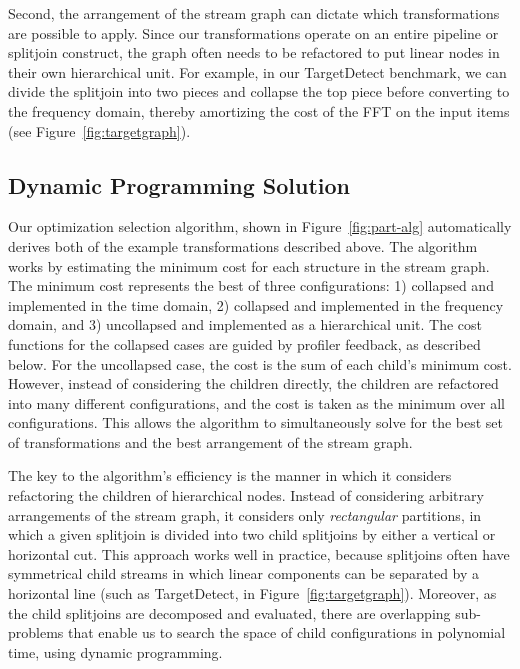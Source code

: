 Second, the arrangement of the stream graph can dictate which
transformations are possible to apply.  Since our transformations
operate on an entire pipeline or splitjoin construct, the
graph often needs to be refactored to put linear nodes in their own
hierarchical unit.  For example, in our TargetDetect benchmark, we can
divide the splitjoin into two pieces and collapse the top piece
before converting to the frequency domain, thereby amortizing the cost
of the FFT on the input items (see Figure~\ref{fig:targetgraph}).

\subsection{Dynamic Programming Solution}

Our optimization selection algorithm, shown in Figure~\ref{fig:part-alg}
automatically derives both of the example transformations described above.  
The algorithm works by estimating the minimum cost for each structure 
in the stream graph. The minimum cost represents the best
of three configurations: 1) collapsed and implemented in the time
domain, 2) collapsed and implemented in the frequency domain, and 3)
uncollapsed and implemented as a hierarchical unit.  The cost
functions for the collapsed cases are guided by profiler feedback, as
described below.  For the uncollapsed case, the cost is the sum of
each child's minimum cost.  However, instead of considering the
children directly, the children are refactored into many different
configurations, and the cost is taken as the minimum over all
configurations.  This allows the algorithm to simultaneously solve for
the best set of transformations and the best arrangement of the stream
graph.

The key to the algorithm's efficiency is the manner in which it
considers refactoring the children of hierarchical nodes.  Instead of
considering arbitrary arrangements of the stream graph, it considers
only {\it rectangular} partitions, in which a given splitjoin is
divided into two child splitjoins by either a vertical or horizontal
cut.  This approach works well in practice, because splitjoins
often have symmetrical child streams in which linear components can be
separated by a horizontal line (such as TargetDetect, in
Figure~\ref{fig:targetgraph}).  Moreover, as the child splitjoins are
decomposed and evaluated, there are overlapping sub-problems that
enable us to search the space of child configurations in polynomial
time, using dynamic programming.

